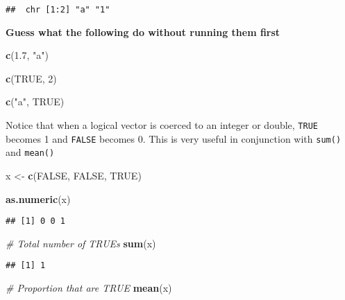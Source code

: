 \documentclass[
]{book}
\newenvironment{Shaded}{\begin{snugshade}}{\end{snugshade}}
\newcommand{\CommentTok}[1]{\textcolor[rgb]{0.56,0.35,0.01}{\textit{#1}}}
\newcommand{\DecValTok}[1]{\textcolor[rgb]{0.00,0.00,0.81}{#1}}
\newcommand{\FloatTok}[1]{\textcolor[rgb]{0.00,0.00,0.81}{#1}}
\newcommand{\KeywordTok}[1]{\textcolor[rgb]{0.13,0.29,0.53}{\textbf{#1}}}
\newcommand{\NormalTok}[1]{#1}
\newcommand{\OtherTok}[1]{\textcolor[rgb]{0.56,0.35,0.01}{#1}}
\newcommand{\StringTok}[1]{\textcolor[rgb]{0.31,0.60,0.02}{#1}}
\begin{document}
\begin{verbatim}
##  chr [1:2] "a" "1"
\end{verbatim}

\textbf{Guess what the following do without running them first}

\begin{Shaded}
\begin{Highlighting}[]
\KeywordTok{c}\NormalTok{(}\FloatTok{1.7}\NormalTok{, }\StringTok{"a"}\NormalTok{)}

\KeywordTok{c}\NormalTok{(}\OtherTok{TRUE}\NormalTok{, }\DecValTok{2}\NormalTok{)}

\KeywordTok{c}\NormalTok{(}\StringTok{"a"}\NormalTok{, }\OtherTok{TRUE}\NormalTok{)}
\end{Highlighting}
\end{Shaded}

Notice that when a logical vector is coerced to an integer or double, \texttt{TRUE} becomes 1 and \texttt{FALSE} becomes 0. This is very useful in conjunction with \texttt{sum()} and \texttt{mean()}

\begin{Shaded}
\begin{Highlighting}[]
\NormalTok{x \textless{}{-}}\StringTok{ }\KeywordTok{c}\NormalTok{(}\OtherTok{FALSE}\NormalTok{, }\OtherTok{FALSE}\NormalTok{, }\OtherTok{TRUE}\NormalTok{)}

\KeywordTok{as.numeric}\NormalTok{(x)}
\end{Highlighting}
\end{Shaded}

\begin{verbatim}
## [1] 0 0 1
\end{verbatim}

\begin{Shaded}
\begin{Highlighting}[]
\CommentTok{\# Total number of TRUEs}
\KeywordTok{sum}\NormalTok{(x)}
\end{Highlighting}
\end{Shaded}

\begin{verbatim}
## [1] 1
\end{verbatim}

\begin{Shaded}
\begin{Highlighting}[]
\CommentTok{\# Proportion that are TRUE}
\KeywordTok{mean}\NormalTok{(x)}
\end{Highlighting}
\end{Shaded}
\end{document}
